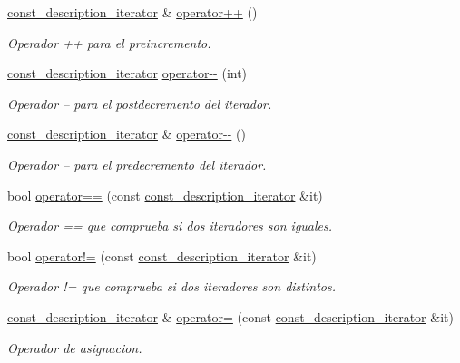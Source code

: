 \begin{DoxyCompactItemize}
\hyperlink{classconjunto_1_1const__description__iterator}{const\-\_\-description\-\_\-iterator} \& \hyperlink{classconjunto_1_1const__description__iterator_a882298de2da31046590bee0a39296cb6}{operator++} ()
\begin{DoxyCompactList}\small\item\em Operador ++ para el preincremento. \end{DoxyCompactList}\item 
\hyperlink{classconjunto_1_1const__description__iterator}{const\-\_\-description\-\_\-iterator} \hyperlink{classconjunto_1_1const__description__iterator_a5fb080ce9a18bb21db34598d55ad71ab}{operator-\/-\/} (int)
\begin{DoxyCompactList}\small\item\em Operador -- para el postdecremento del iterador. \end{DoxyCompactList}\item 
\hyperlink{classconjunto_1_1const__description__iterator}{const\-\_\-description\-\_\-iterator} \& \hyperlink{classconjunto_1_1const__description__iterator_a28bbf5daeed818ba83b41f18a2d63b9b}{operator-\/-\/} ()
\begin{DoxyCompactList}\small\item\em Operador -- para el predecremento del iterador. \end{DoxyCompactList}\item 
bool \hyperlink{classconjunto_1_1const__description__iterator_a10b1ae1aef96a8c424ca65578c18993f}{operator==} (const \hyperlink{classconjunto_1_1const__description__iterator}{const\-\_\-description\-\_\-iterator} \&it)
\begin{DoxyCompactList}\small\item\em Operador == que comprueba si dos iteradores son iguales. \end{DoxyCompactList}\item 
bool \hyperlink{classconjunto_1_1const__description__iterator_ab6edb507aa74528f97a579df5ebb210f}{operator!=} (const \hyperlink{classconjunto_1_1const__description__iterator}{const\-\_\-description\-\_\-iterator} \&it)
\begin{DoxyCompactList}\small\item\em Operador != que comprueba si dos iteradores son distintos. \end{DoxyCompactList}\item 
\hyperlink{classconjunto_1_1const__description__iterator}{const\-\_\-description\-\_\-iterator} \& \hyperlink{classconjunto_1_1const__description__iterator_ab72ac0951f5a6d5f9490450aa4ed6911}{operator=} (const \hyperlink{classconjunto_1_1const__description__iterator}{const\-\_\-description\-\_\-iterator} \&it)
\begin{DoxyCompactList}\small\item\em Operador de asignacion. \end{DoxyCompactList}\end{DoxyCompactItemize}
